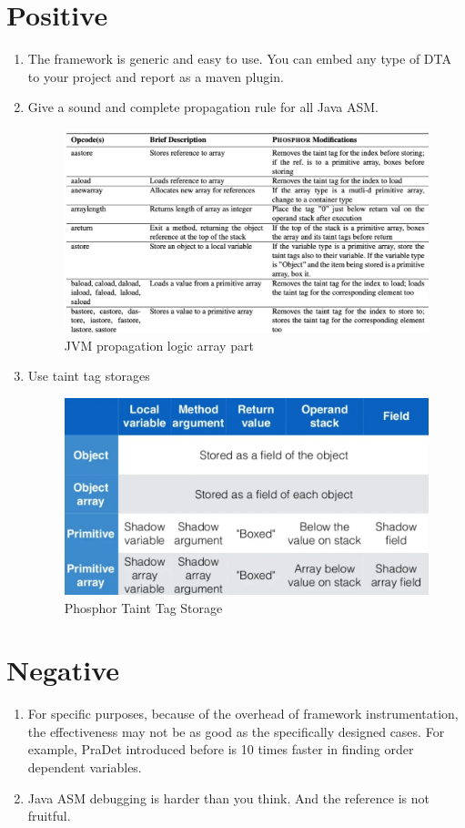 \documentclass[conference]{IEEEtran}
\begin{document}
\section{Positive}
\begin{enumerate}
    \item The framework is generic and easy to use. You can embed any type of DTA to your project and report as a maven plugin.
    \item Give a sound and complete propagation rule for all Java ASM.
          \begin{figure}[htbp]
              \centering
              \includegraphics[width=0.6\columnwidth]{./jvm_array.png}
              \caption{JVM propagation logic array part}
          \end{figure}
    \item Use taint tag storages
          \begin{figure}[htbp]
              \centering
              \includegraphics[width=0.6\columnwidth]{./taint_storage.png}
              \caption{Phosphor Taint Tag Storage}
          \end{figure}
\end{enumerate}
\section{Negative}
\begin{enumerate}
    \item For specific purposes, because of the overhead of framework instrumentation, the effectiveness may not be as good as the specifically designed cases. For example, PraDet \cite{b5} introduced before is 10 times faster in finding order dependent variables.
    \item Java ASM debugging is harder than you think. And the reference is not fruitful.
\end{enumerate}
\end{document}
